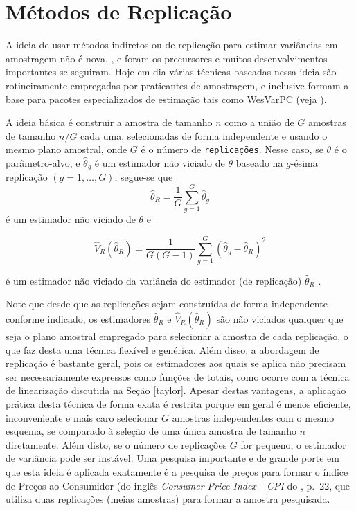 \documentclass[]{book}
\theoremstyle{definition}
\theoremstyle{definition}
\theoremstyle{definition}
\theoremstyle{remark}
\begin{document}
\section{Métodos de Replicação}\label{metodos-de-replicacao}

A ideia de usar métodos indiretos ou de replicação para estimar
variâncias em amostragem não é nova. \citep{Mahala39}, \citep{Mahala44}
e \citep{deming} foram os precursores e muitos desenvolvimentos
importantes se seguiram. Hoje em dia várias técnicas baseadas nessa
ideia são rotineiramente empregadas por praticantes de amostragem, e
inclusive formam a base para pacotes especializados de estimação tais
como WesVarPC (veja \citep{Westat}).

A ideia básica é construir a amostra de tamanho \(n\) como a união de
\(G\) amostras de tamanho \(n/G\) cada uma, selecionadas de forma
independente e usando o mesmo plano amostral, onde \(G\) é o número de
\texttt{replicações}. Nesse caso, se \(\theta\) é o parâmetro-alvo, e
\(\widehat{\theta}_{g}\) é um estimador não viciado de \(\theta\)
baseado na \(g\)-ésima replicação \((g=1,\ldots ,G)\), segue-se que \[
\widehat{\theta }_{R}=\frac{1}{G}\sum_{g=1}^{G}\widehat{\theta }_{g} 
\] é um estimador não viciado de \(\theta\) e

\begin{equation}
\widehat{V}_{R}\left( \widehat{\theta }_{R}\right) =\frac{1}{G\left(
G-1\right) }\sum_{g=1}^{G}\left( \widehat{\theta }_{g}-\widehat{\theta }
_{R}\right) ^{2}  \label{eq:estpa24}
\end{equation}

é um estimador não viciado da variância do estimador (de replicação)
\(\widehat{\theta }_{R}\) .

Note que desde que as replicações sejam construídas de forma
independente conforme indicado, os estimadores \(\widehat{\theta }_{R}\)
e \(\widehat{V}_{R}\left( \widehat{\theta }_{R}\right)\) são não
viciados qualquer que seja o plano amostral empregado para selecionar a
amostra de cada replicação, o que faz desta uma técnica flexível e
genérica. Além disso, a abordagem de replicação é bastante geral, pois
os estimadores aos quais se aplica não precisam ser necessariamente
expressos como funções de totais, como ocorre com a técnica de
linearização discutida na Seção \ref{taylor}. Apesar destas vantagens, a
aplicação prática desta técnica de forma exata é restrita porque em
geral é menos eficiente, inconveniente e mais caro selecionar \(G\)
amostras independentes com o mesmo esquema, se comparado à seleção de
uma única amostra de tamanho \(n\) diretamente. Além disto, se o número
de replicações \(G\) for pequeno, o estimador de variância pode ser
instável. Uma pesquisa importante e de grande porte em que esta ideia é
aplicada exatamente é a pesquisa de preços para formar o índice de
Preços ao Consumidor (do inglês \emph{Consumer Price Index - CPI} do
\citep{USBureau}, p.~22, que utiliza duas replicações (meias amostras)
para formar a amostra pesquisada.
\end{document}
